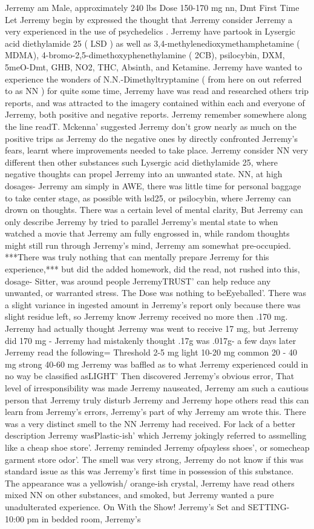 \documentclass[12pt]{book}
\begin{document}
Jerremy am Male, approximately 240 lbs Dose 150-170 mg nn, Dmt First Time Let Jerremy begin by expressed the thought that Jerremy consider Jerremy a very experienced in the use of psychedelics . Jerremy have partook in Lysergic acid diethylamide 25 ( LSD ) as well as 3,4-methylenedioxymethamphetamine ( MDMA), 4-bromo-2,5-dimethoxyphenethylamine ( 2CB), psilocybin, DXM, 5meO-Dmt, GHB, NO2, THC, Absinth, and Ketamine. Jerremy have wanted to experience the wonders of N.N.-Dimethyltryptamine ( from here on out referred to as NN ) for quite some time, Jerremy have was read and researched others trip reports, and was attracted to the imagery contained within each and everyone of Jerremy, both positive and negative reports. Jerremy remember somewhere along the line readT. Mckenna' suggested Jerremy don't grow nearly as much on the positive trips as Jerremy do the negative ones by directly confronted Jerremy's fears, learnt where improvements needed to take place. Jerremy consider NN very different then other substances such Lysergic acid diethylamide 25, where negative thoughts can propel Jerremy into an unwanted state. NN, at high dosages- Jerremy am simply in AWE, there was little time for personal baggage to take center stage, as possible with lsd25, or psilocybin, where Jerremy can drown on thoughts. There was a certain level of mental clarity, But Jerremy can only describe Jerremy by tried to parallel Jerremy's mental state to when watched a movie that Jerremy am fully engrossed in, while random thoughts might still run through Jerremy's mind, Jerremy am somewhat pre-occupied. ***There was truly nothing that can mentally prepare Jerremy for this experience,*** but did the added homework, did the read, not rushed into this, dosage- Sitter, was around people JerremyTRUST' can help reduce any unwanted, or warranted stress. The Dose was nothing to beEyeballed'. There was a slight variance in ingested amount in Jerremy's report only because there was slight residue left, so Jerremy know Jerremy received no more then .170 mg. Jerremy had actually thought Jerremy was went to receive 17 mg, but Jerremy did 170 mg - Jerremy had mistakenly thought .17g was .017g- a few days later Jerremy read the following= Threshold 2-5 mg light 10-20 mg common 20 - 40 mg strong 40-60 mg Jerremy was baffled as to what Jerremy experienced could in no way be classified asLIGHT' Then discovered Jerremy's obvious error, That level of irresponsibility was made Jerremy nauseated, Jerremy am such a cautious person that Jerremy truly disturb Jerremy and Jerremy hope others read this can learn from Jerremy's errors, Jerremy's part of why Jerremy am wrote this. There was a very distinct smell to the NN Jerremy had received. For lack of a better description Jerremy wasPlastic-ish' which Jerremy jokingly referred to assmelling like a cheap shoe store'. Jerremy reminded Jerremy ofpayless shoes', or somecheap garment store odor'. The smell was very strong, Jerremy do not know if this was standard issue as this was Jerremy's first time in possession of this substance. The appearance was a yellowish/ orange-ish crystal, Jerremy have read others mixed NN on other substances, and smoked, but Jerremy wanted a pure unadulterated experience. On With the Show! Jerremy's Set and SETTING- 10:00 pm in bedded room, Jerremy's 
\end{document}
